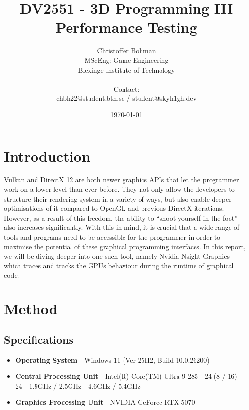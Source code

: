 \documentclass{article}
\title{DV2551 - 3D Programming III \\
	\large Performance Testing
	}
\author{Christoffer Bohman \\
	MScEng: Game Engineering \\
	Blekinge Institute of Technology \\
	\\
	Contact: \\
	chbh22@student.bth.se / student@skyh1gh.dev \\
	}
\date{\today}
\begin{document}
\maketitle

\newpage

\section{Introduction}

Vulkan and DirectX 12 are both newer graphics APIs that let the programmer work on a lower level than ever before. They not only allow the developers to structure their rendering
system in a variety of ways, but also enable deeper optimisations of it compared to OpenGL and previous DirectX iterations. However, as a result of this freedom, the ability
to ``shoot yourself in the foot'' also increases significantly. With this in mind, it is crucial that a wide range of tools and programs need to be accessible for the programmer
in order to maximise the potential of these graphical programming interfaces. In this report, we will be diving deeper into one such tool, namely Nvidia Nsight Graphics which 
traces and tracks the GPUs behaviour during the runtime of graphical code.

\section{Method}

\subsection{Specifications}

\begin{itemize}
	\item \textbf{Operating System} - Windows 11 (Ver 25H2, Build 10.0.26200)

	\item \textbf{Central Processing Unit} - Intel(R) Core(TM) Ultra 9 285
	 - 24 (8 / 16)
	 - 24
	 - 1.9GHz / 2.5GHz
	 - 4.6GHz / 5.4GHz

	\item \textbf{Graphics Processing Unit} - NVIDIA GeForce RTX 5070

\end{itemize}
\end{document}
